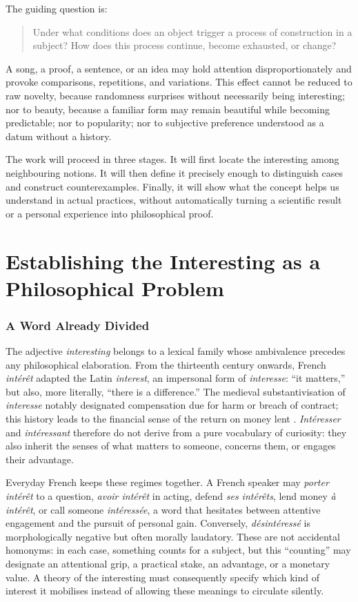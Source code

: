 \documentclass[11pt,a4paper]{article}
\begin{document}
The guiding question is:

\begin{quote}
Under what conditions does an object trigger a process of construction in a
subject? How does this process continue, become exhausted, or change?
\end{quote}

A song, a proof, a sentence, or an idea may hold attention disproportionately
and provoke comparisons, repetitions, and variations. This effect cannot be
reduced to raw novelty, because randomness surprises without necessarily being
interesting; nor to beauty, because a familiar form may remain beautiful while
becoming predictable; nor to popularity; nor to subjective preference
understood as a datum without a history.

The work will proceed in three stages. It will first locate the interesting
among neighbouring notions. It will then define it precisely enough to
distinguish cases and construct counterexamples. Finally, it will show what the
concept helps us understand in actual practices, without
automatically turning a scientific result or a personal experience into
philosophical proof.

\part{Establishing the Interesting as a Philosophical Problem}

\section{A Word Already Divided}

The adjective \emph{interesting} belongs to a lexical family whose ambivalence
precedes any philosophical elaboration. From the thirteenth century onwards,
French \emph{intérêt} adapted the Latin \emph{interest}, an impersonal form of
\emph{interesse}: ``it matters,'' but also, more literally, ``there is a
difference.'' The medieval substantivisation of \emph{interesse} notably
designated compensation due for harm or breach of contract; this history leads
to the financial sense of the return on money lent
\parencite{academie2026interet,cnrtl2026interet}. \emph{Intéresser} and
\emph{intéressant} therefore do not derive from a pure vocabulary of curiosity:
they also inherit the senses of what matters to someone, concerns them, or
engages their advantage.

Everyday French keeps these regimes together. A French speaker may \emph{porter
intérêt} to a question, \emph{avoir intérêt} in acting, defend \emph{ses
intérêts}, lend money \emph{à intérêt}, or call someone \emph{intéressée}, a
word that hesitates between attentive engagement and the pursuit of personal gain.
Conversely, \emph{désintéressé} is morphologically negative but often morally
laudatory. These are not accidental homonyms: in each case, something counts
for a subject, but this ``counting'' may designate an attentional grip, a
practical stake, an advantage, or a monetary value. A theory of the interesting
must consequently specify which kind of interest it mobilises instead of
allowing these meanings to circulate silently.
\end{document}
